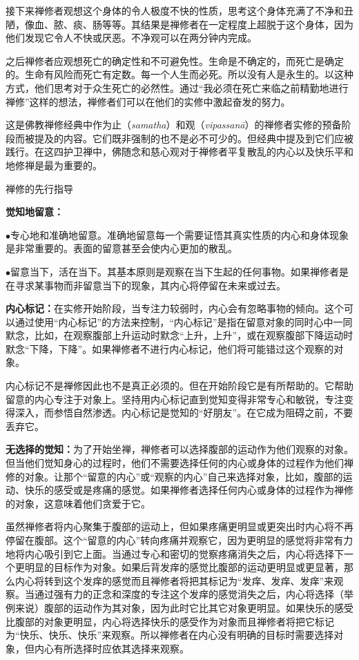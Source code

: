 接下来禅修者观想这个\1身体的令人极度不快的性质，思考这个身体充满了不净和丑陋，像血、脓、痰、肠等等。其结果是禅修者在一定程度上超脱于这个身体，因为他们发现它令人不快或厌恶。不净观可以在两分钟内完成。

之后禅修者应观想死亡的确定性和不可避免性。生命是不确定的，而死亡是确定的。生命有风险而死亡有定数。每一个人生而必死。所以没有人是永生的。以这种方式，他们思考对于众生死亡的必然性。通过“我必须在死亡来临之前精勤地进行禅修”这样的想法，禅修者们可以在他们的实修中激起奋发的努力。

这是佛教禅修经典中作为止（{\it samatha}）和观（{\it vipassan\=a}）的禅修者实修的预备阶段而被提及的内容。它们既非强制的也不是必不可少的。但经典中提及到它们应被践行。在这四护卫禅中，佛随念和慈心观对于禅修者平复散乱的内心以及快乐平和地修禅是最为重要的。

\sssubsectnonb 禅修的先行指导

{\bf 觉知地留意：}

$\bullet$专心地和准确地留意。准确地留意每一个需要证悟其真实性质的内心和身体现象是非常重要的。表面的留意甚至会使内心更加的散乱。

$\bullet$留意当下，活在当下。其基本原则是观察\1在当下生起的任何事物。如果禅修者是在寻求某事物而非留意当下的现象，其内心将停留在未来或过去。


{\bf 内心标记：}在实修开始阶段，当专注力较弱时，内心会有忽略事物的倾向。这个可以通过使用“内心标记”的方法来控制，“内心标记”是指在留意对象的同时心中一同默念，比如，在观察腹部上升运动时默念“上升，上升”，或在观察腹部下降运动时默念“下降，下降”。如果禅修者不进行内心标记，他们将可能错过这个观察的对象。

内心标记不是禅修因此也不是真正必须的。但在开始阶段它是有所帮助的。它帮助留意的内心专注于对象上。坚持用内心标记直到觉知变得非常专心和敏锐，专注变得深入，而参悟自然渗透。内心标记是觉知的“好朋友”。在它成为阻碍之前，不要丢弃它。

{\bf 无选择的觉知：}为了开始坐禅，禅修者可以选择腹部的运动作为他们观察的对象。但当他们觉知身心的过程时，他们不需要选择任何的内心或身体的过程作为他们禅修的对象。让那个“留意的内心”或“观察的内心”自己来选择对象，比如，腹部的运动、快乐的感受或是疼痛的感觉。如果禅修者选择任何内心或身体的过程作为禅修的对象，这意味着他们贪爱于它。

\1虽然禅修者将内心聚集于腹部的运动上，但如果疼痛更明显或更突出时内心将不再停留在腹部。这个“留意的内心”转向疼痛并观察它，因为更明显的感觉将非常有力地将内心吸引到它上面。当通过专心和密切的觉察疼痛消失之后，内心将选择下一个更明显的目标作为对象。如果后背发痒的感觉比腹部的运动更明显或更显著，那么内心将转到这个发痒的感觉而且禅修者将把其标记为“发痒、发痒、发痒”来观察。当通过强有力的正念和深度的专注这个发痒的感觉消失之后，内心将选择（举例来说）腹部的运动作为其对象，因为此时它比其它对象更明显。如果快乐的感受比腹部的对象更明显，内心将选择快乐的感受作为对象而且禅修者将把它标记为“快乐、快乐、快乐”来观察。所以禅修者在内心没有明确的目标时需要选择对象，但内心有所选择时应依其选择来观察。

